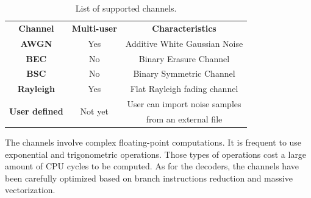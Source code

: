 \begin{table}
  \centering
  \caption{List of supported channels.}
  \label{tab:lib_channels}
  \begin{tabular}{ c | c | c }
  \multirow{2}{*}{\textbf{Channel}}      & \multirow{2}{*}{\textbf{Multi-user}} & \multirow{2}{*}{\textbf{Characteristics}}      \\
                                         &                                      &                                                \\
  \hline
  \hline
  \multirow{2}{*}{\textbf{AWGN}}         & \multirow{2}{*}{Yes}                 & \multirow{2}{*}{Additive White Gaussian Noise} \\
                                         &                                      &                                                \\
  \hline
  \multirow{2}{*}{\textbf{BEC}}          & \multirow{2}{*}{No}                  & \multirow{2}{*}{Binary Erasure Channel}        \\
                                         &                                      &                                                \\
  \hline
  \multirow{2}{*}{\textbf{BSC}}          & \multirow{2}{*}{No}                  & \multirow{2}{*}{Binary Symmetric Channel}      \\
                                         &                                      &                                                \\
  \hline
  \multirow{2}{*}{\textbf{Rayleigh}}     & \multirow{2}{*}{Yes}                 & \multirow{2}{*}{Flat Rayleigh fading channel}  \\
                                         &                                      &                                                \\
  \hline
  \multirow{2}{*}{\textbf{User defined}} & \multirow{2}{*}{Not yet}             & User can import noise samples                  \\
                                         &                                      & from an external file                          \\
  \end{tabular}
\end{table}

The channels involve complex floating-point computations. It is frequent to use
exponential and trigonometric operations. Those types of operations cost a large
amount of CPU cycles to be computed. As for the decoders, the channels have been
carefully optimized based on branch instructions reduction and massive
vectorization.


